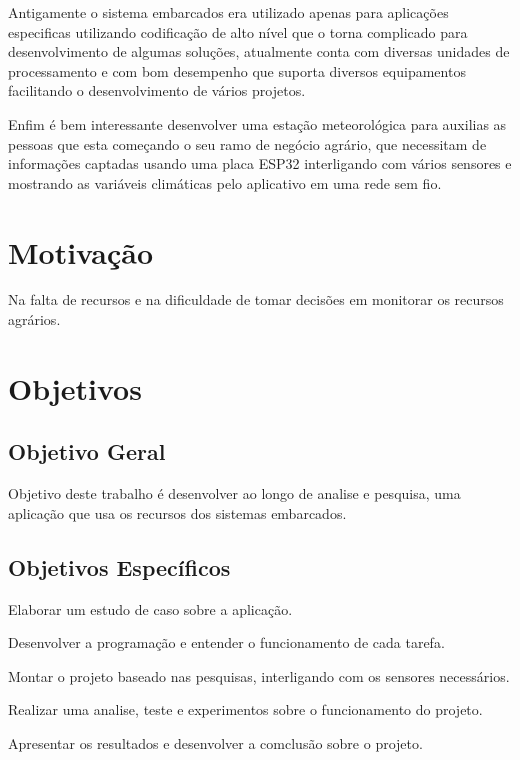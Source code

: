 Antigamente o sistema embarcados era utilizado apenas para aplicações especificas utilizando codificação de alto nível que o torna complicado para desenvolvimento de algumas soluções, atualmente conta com diversas unidades de processamento e com bom desempenho que suporta diversos equipamentos facilitando o desenvolvimento de vários projetos.  

Enfim é bem interessante desenvolver uma estação meteorológica para auxilias as pessoas que esta começando o seu ramo de negócio agrário, que necessitam de informações captadas usando uma placa  ESP32 interligando com vários sensores e mostrando as variáveis climáticas pelo aplicativo em uma rede sem fio. 




\section{Motivação}
\label{sec:motivacao}

Na falta de recursos e na dificuldade de tomar decisões em monitorar os recursos agrários.

\section{Objetivos}
\label{sec:objetivos}



\subsection{Objetivo Geral}
\label{sec:objetivo-geral}

Objetivo deste trabalho é desenvolver ao longo de analise e pesquisa, uma aplicação que usa os recursos dos sistemas embarcados.            

\subsection{Objetivos Específicos}
\label{sec:objetivos-especificos}



	\begin{alineas}
		\item Elaborar um estudo de caso sobre a aplicação.
		\item Desenvolver a programação e entender o funcionamento de cada tarefa.
		\item Montar o projeto baseado nas pesquisas, interligando com os sensores necessários.
		\item Realizar uma analise, teste e experimentos sobre o funcionamento do projeto.
		\item Apresentar os resultados e desenvolver a comclusão sobre o projeto.
	\end{alineas}